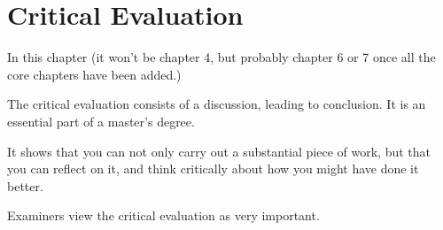 \chapter{Critical Evaluation}

In this chapter (it won’t be chapter 4, but probably chapter 6 or 7 once all the core chapters have been added.)

The critical evaluation consists of a discussion, leading to conclusion.  It is an essential part of a master’s degree.

It shows that you can not only carry out a substantial piece of work, but that you can reflect on it, and think critically about how you might have done it better.

Examiners view the critical evaluation as very important.
